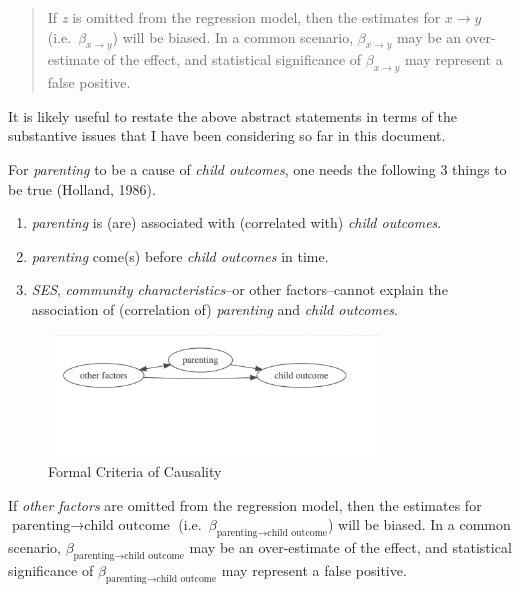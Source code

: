 \documentclass[
  letterpaper,
  DIV=11,
  numbers=noendperiod]{scrreprt}
\providecommand{\tightlist}{%
  \setlength{\itemsep}{0pt}\setlength{\parskip}{0pt}}\usepackage{longtable,booktabs,array}
\begin{document}
\begin{quote}
If \emph{z} is omitted from the regression model, then the estimates for
\(x \rightarrow y\) (i.e.~\(\beta_{x \rightarrow y}\)) will be biased.
In a common scenario, \(\beta_{x \rightarrow y}\) may be an
over-estimate of the effect, and statistical significance of
\(\beta_{x \rightarrow y}\) may represent a false positive.
\end{quote}

It is likely useful to restate the above abstract statements in terms of
the substantive issues that I have been considering so far in this
document.

For \emph{parenting} to be a cause of \emph{child outcomes}, one needs
the following 3 things to be true (Holland, 1986).

\begin{enumerate}
\def\labelenumi{\arabic{enumi}.}
\tightlist
\item
  \emph{parenting} is (are) associated with (correlated with)
  \emph{child outcomes}.
\item
  \emph{parenting} come(s) before \emph{child outcomes} in time.
\item
  \emph{SES}, \emph{community characteristics}--or other factors--cannot
  explain the association of (correlation of) \emph{parenting} and
  \emph{child outcomes}.
\end{enumerate}

\begin{figure}

{\centering \includegraphics[width=3.46in,height=\textheight]{./fig-causalitysubstantive.png}

}

\caption{\label{fig-causalitysubstantive}Formal Criteria of Causality}

\end{figure}

If \emph{other factors} are omitted from the regression model, then the
estimates for \(\text{parenting} \rightarrow \text{child outcome}\)
(i.e.~\(\beta_{\text{parenting} \rightarrow \text{child outcome}}\))
will be biased. In a common scenario,
\(\beta_{\text{parenting} \rightarrow \text{child outcome}}\) may be an
over-estimate of the effect, and statistical significance of
\(\beta_{\text{parenting} \rightarrow \text{child outcome}}\) may
represent a false positive.
\end{document}
